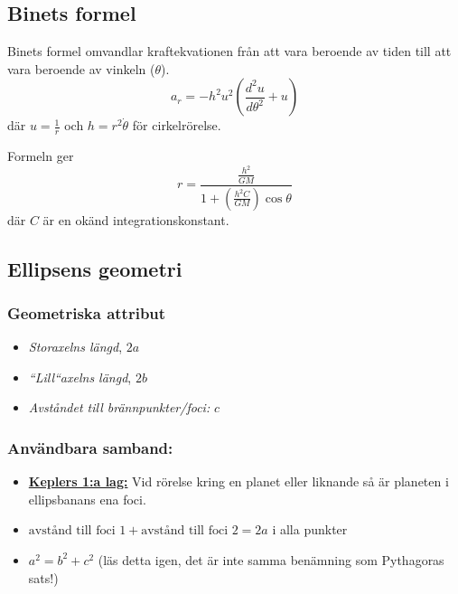 \documentclass{article}
\newenvironment{ankiflashcard}[1]{}{}
\begin{document}
\begin{paracol}{2}
\begin{ankiflashcard}{Formulera Binets formel.}
\subsection{Binets formel}
Binets formel omvandlar kraftekvationen från att vara beroende av tiden till att vara beroende av vinkeln ($\theta$).
$$a_r = -h^2u^2\left(\frac{d^2u}{d\theta^2}+u\right)$$
där $u=\frac{1}{r}$ och $h=r^2\dot \theta$ för cirkelrörelse.
\end{ankiflashcard}

\begin{ankiflashcard}{Uttryck radie med hjälp av Binets formel}
    
Formeln ger
$$
r=\frac{\frac{h^2}{GM}}{1+(\frac{h^2C}{GM})\cos \theta}
$$
där $C$ är en okänd integrationskonstant.
\end{ankiflashcard}
\subsection{Ellipsens geometri}

\begin{ankiflashcard}{Hur benämns de olika sträckorna i ellipsen}
    
\subsubsection{Geometriska attribut}
\begin{itemize}
    \item \textit{Storaxelns längd}, $2a$
    \item  \textit{``Lill``axelns längd}, $2b$
    \item \textit{Avståndet till brännpunkter/foci:} $c$
\end{itemize}
\end{ankiflashcard}


\begin{ankiflashcard}{Ställ upp användbara samband kring ellipsens geometri.}
\subsubsection{Användbara samband:}
\begin{itemize}
    \item \underline{\textbf{Keplers 1:a lag:}} Vid rörelse kring en planet eller liknande så är planeten i ellipsbanans ena foci.
    \item $\text{avstånd till foci 1}+\text{avstånd till foci 2} = 2a$ i alla punkter
    \item $a^2=b^2+c^2$ (läs detta igen, det är inte samma benämning som Pythagoras sats!)
\end{itemize}
\end{ankiflashcard}


\end{paracol}
\end{document}
